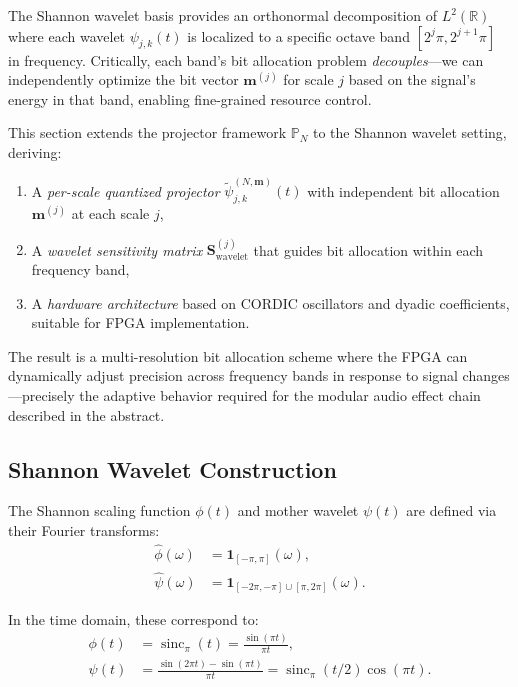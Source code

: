The Shannon wavelet basis provides an orthonormal decomposition of $L^2(\mathbb{R})$ where each wavelet $\psi_{j,k}(t)$ is localized to a specific octave band $[2^j\pi, 2^{j+1}\pi]$ in frequency. Critically, each band's bit allocation problem \emph{decouples}—we can independently optimize the bit vector $\mathbf{m}^{(j)}$ for scale $j$ based on the signal's energy in that band, enabling fine-grained resource control.

This section extends the projector framework $\mathbb{P}_N$ to the Shannon wavelet setting, deriving:
\begin{enumerate}
\item A \emph{per-scale quantized projector} $\widetilde{\psi}_{j,k}^{(N,\mathbf{m})}(t)$ with independent bit allocation $\mathbf{m}^{(j)}$ at each scale $j$,
\item A \emph{wavelet sensitivity matrix} $\mathbf{S}_{\text{wavelet}}^{(j)}$ that guides bit allocation within each frequency band,
\item A \emph{hardware architecture} based on CORDIC oscillators and dyadic coefficients, suitable for FPGA implementation.
\end{enumerate}

The result is a multi-resolution bit allocation scheme where the FPGA can dynamically adjust precision across frequency bands in response to signal changes—precisely the adaptive behavior required for the modular audio effect chain described in the abstract.

\subsection{Shannon Wavelet Construction}

The Shannon scaling function $\phi(t)$ and mother wavelet $\psi(t)$ are defined via their Fourier transforms:
\begin{align}
\widehat{\phi}(\omega) &= \mathbf{1}_{[-\pi,\pi]}(\omega), \label{eq:shannon_scaling_freq}\\
\widehat{\psi}(\omega) &= \mathbf{1}_{[-2\pi,-\pi] \cup [\pi,2\pi]}(\omega). \label{eq:shannon_wavelet_freq}
\end{align}

In the time domain, these correspond to:
\begin{align}
\phi(t) &= \operatorname{sinc}_\pi(t) = \frac{\sin(\pi t)}{\pi t}, \label{eq:shannon_scaling_time}\\
\psi(t) &= \frac{\sin(2\pi t) - \sin(\pi t)}{\pi t} = \operatorname{sinc}_\pi(t/2) \cos(\pi t). \label{eq:shannon_wavelet_time}
\end{align}

